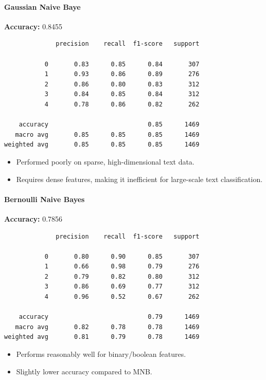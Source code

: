 \documentclass[a4paper,12pt]{article}
\begin{document}
\paragraph{Gaussian Naive Baye\\}
\textbf{Accuracy:} 0.8455

\begin{verbatim}
              precision    recall  f1-score   support

           0       0.83      0.85      0.84       307
           1       0.93      0.86      0.89       276
           2       0.86      0.80      0.83       312
           3       0.84      0.85      0.84       312
           4       0.78      0.86      0.82       262

    accuracy                           0.85      1469
   macro avg       0.85      0.85      0.85      1469
weighted avg       0.85      0.85      0.85      1469
\end{verbatim}
\begin{itemize}
    \item Performed poorly on sparse, high-dimensional text data.
    \item Requires dense features, making it inefficient for large-scale text classification.
\end{itemize}

\paragraph{Bernoulli Naive Bayes\\}
\textbf{Accuracy:} 0.7856

\begin{verbatim}
              precision    recall  f1-score   support

           0       0.80      0.90      0.85       307
           1       0.66      0.98      0.79       276
           2       0.79      0.82      0.80       312
           3       0.86      0.69      0.77       312
           4       0.96      0.52      0.67       262

    accuracy                           0.79      1469
   macro avg       0.82      0.78      0.78      1469
weighted avg       0.81      0.79      0.78      1469
\end{verbatim}
\begin{itemize}
    \item Performs reasonably well for binary/boolean features.
    \item Slightly lower accuracy compared to MNB.
\end{itemize}
\end{document}
